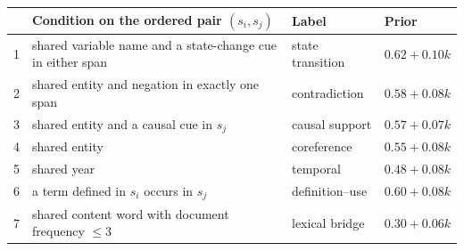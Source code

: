 \begin{tabular}{@{}rp{}ll@{}}
\toprule
 & Condition on the ordered pair $(s_i,s_j)$ & Label & Prior \\
\midrule
1 & shared variable name and a state-change cue in either span & state transition & $0.62+0.10k$ \\
2 & shared entity and negation in exactly one span & contradiction & $0.58+0.08k$ \\
3 & shared entity and a causal cue in $s_j$ & causal support & $0.57+0.07k$ \\
4 & shared entity & coreference & $0.55+0.08k$ \\
5 & shared year & temporal & $0.48+0.08k$ \\
6 & a term defined in $s_i$ occurs in $s_j$ & definition--use & $0.60+0.08k$ \\
7 & shared content word with document frequency $\le 3$ & lexical bridge & $0.30+0.06k$ \\
\bottomrule
\end{tabular}
